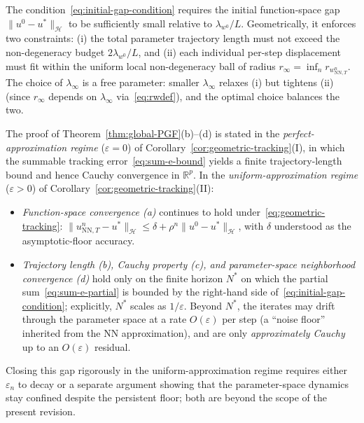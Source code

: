 \documentclass[twoside,11pt]{article}
\newcommand{\R}{\mathbb{R}}
\newcommand{\NN}{\mathrm{NN}}
\newcommand{\calH}{\mathcal{H}}
\begin{document}
\begin{remark}\label{rem:initial-gap}
The condition~\eqref{eq:initial-gap-condition} requires the initial function-space gap $\|u^0-u^*\|_\calH$ to be sufficiently small relative to $\lambda_{w^0}/L$. Geometrically, it enforces two constraints: (i) the total parameter trajectory length must not exceed the non-degeneracy budget $2\lambda_{w^0}/L$, and (ii) each individual per-step displacement must fit within the uniform local non-degeneracy ball of radius $r_\infty=\inf_n r_{w^n_{\NN,T}}$. The choice of $\lambda_\infty$ is a free parameter: smaller $\lambda_\infty$ relaxes (i) but tightens (ii) (since $r_\infty$ depends on $\lambda_\infty$ via~\eqref{eq:rwdef}), and the optimal choice balances the two.
\end{remark}

\begin{remark}\label{rem:phase4-regime}
The proof of Theorem~\ref{thm:global-PGF}(b)--(d) is stated in the \emph{perfect-approximation regime} ($\varepsilon=0$) of Corollary~\ref{cor:geometric-tracking}(I), in which the summable tracking error~\eqref{eq:sum-e-bound} yields a finite trajectory-length bound and hence Cauchy convergence in $\R^p$. In the \emph{uniform-approximation regime} ($\varepsilon>0$) of Corollary~\ref{cor:geometric-tracking}(II):
\begin{itemize}[leftmargin=*,nosep]
\item \emph{Function-space convergence (a)} continues to hold under~\eqref{eq:geometric-tracking}: $\|u^n_{\NN,T}-u^*\|_\calH\le\delta+\rho^n\|u^0-u^*\|_\calH$, with $\delta$ understood as the asymptotic-floor accuracy.
\item \emph{Trajectory length (b), Cauchy property (c), and parameter-space neighborhood convergence (d)} hold only on the finite horizon $N^*$ on which the partial sum~\eqref{eq:sum-e-partial} is bounded by the right-hand side of~\eqref{eq:initial-gap-condition}; explicitly, $N^*$ scales as $1/\varepsilon$. Beyond $N^*$, the iterates may drift through the parameter space at a rate $O(\varepsilon)$ per step (a ``noise floor'' inherited from the NN approximation), and are only \emph{approximately Cauchy} up to an $O(\varepsilon)$ residual.
\end{itemize}
Closing this gap rigorously in the uniform-approximation regime requires either $\varepsilon_n$ to decay or a separate argument showing that the parameter-space dynamics stay confined despite the persistent floor; both are beyond the scope of the present revision.
\end{remark}
\end{document}
